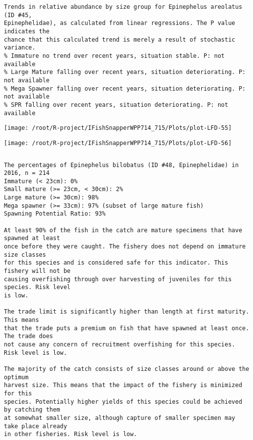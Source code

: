 \documentclass{report}\usepackage[]{graphicx}\usepackage[]{color}
\makeatletter
\def\maxwidth{ %
  \ifdim\Gin@nat@width>\linewidth
    \linewidth
  \else
    \Gin@nat@width
  \fi
}
\newenvironment{kframe}{%
 \def\at@end@of@kframe{}%
 \ifinner\ifhmode%
  \def\at@end@of@kframe{\end{minipage}}%
  \begin{minipage}{\columnwidth}%
 \fi\fi%
 \def\FrameCommand##1{\hskip\@totalleftmargin \hskip-\fboxsep
 \colorbox{shadecolor}{##1}\hskip-\fboxsep
     \hskip-\linewidth \hskip-\@totalleftmargin \hskip\columnwidth}%
 \MakeFramed {\advance\hsize-\width
   \@totalleftmargin\z@ \linewidth\hsize
   \@setminipage}}%
 {\par\unskip\endMakeFramed%
 \at@end@of@kframe}
\newenvironment{knitrout}{}{} %
\makeatother
\begin{document}
\begin{knitrout}
\begin{kframe}
\begin{verbatim}
Trends in relative abundance by size group for Epinephelus areolatus (ID #45,
Epinephelidae), as calculated from linear regressions. The P value indicates the
chance that this calculated trend is merely a result of stochastic variance.
% Immature no trend over recent years, situation stable. P: not available
% Large Mature falling over recent years, situation deteriorating. P: not available
% Mega Spawner falling over recent years, situation deteriorating. P: not available
% SPR falling over recent years, situation deteriorating. P: not available
\end{verbatim}
\end{kframe}
\texttt{[image: /root/R-project/IFishSnapperWPP714\_715/Plots/plot-LFD-55]} 

\texttt{[image: /root/R-project/IFishSnapperWPP714\_715/Plots/plot-LFD-56]} 
\begin{kframe}\begin{verbatim}
\end{verbatim}
\end{kframe}
\clearpage
\newpage
\begin{kframe}\begin{verbatim}The percentages of Epinephelus bilobatus (ID #48, Epinephelidae) in 2016, n = 214
Immature (< 23cm): 0%
Small mature (>= 23cm, < 30cm): 2%
Large mature (>= 30cm): 98%
Mega spawner (>= 33cm): 97% (subset of large mature fish)
Spawning Potential Ratio: 93%
 
At least 90% of the fish in the catch are mature specimens that have spawned at least
once before they were caught. The fishery does not depend on immature size classes
for this species and is considered safe for this indicator. This fishery will not be
causing overfishing through over harvesting of juveniles for this species. Risk level
is low.

The trade limit is significantly higher than length at first maturity.  This means
that the trade puts a premium on fish that have spawned at least once. The trade does
not cause any concern of recruitment overfishing for this species. Risk level is low.

The majority of the catch consists of size classes around or above the optimum
harvest size. This means that the impact of the fishery is minimized for this
species. Potentially higher yields of this species could be achieved by catching them
at somewhat smaller size, although capture of smaller specimen may take place already
in other fisheries. Risk level is low.


\end{verbatim}
\end{kframe}
\end{knitrout}
\end{document}
